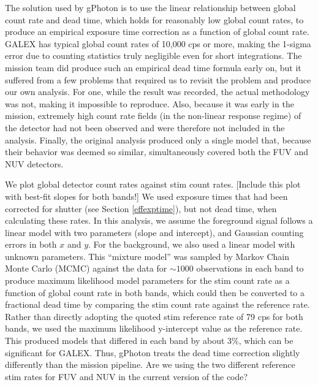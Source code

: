 \documentclass[5p]{elsarticle}
\begin{document}
The solution used by gPhoton is to use the linear relationship between global count rate and dead time, which holds for reasonably low global count rates, to produce an empirical exposure time correction as a function of global count rate. GALEX has typical global count rates of 10,000 cps or more, making the 1-sigma error due to counting statistics truly negligible even for short integrations. The mission team did produce such an empirical dead time formula early on, but it suffered from a few problems that required us to revisit the problem and produce our own analysis. For one, while the result was recorded, the actual methodology was not, making it impossible to reproduce. Also, because it was early in the mission, extremely high count rate fields (in the non-linear response regime) of the detector had not been observed and were therefore not included in the analysis. Finally, the original analysis produced only a single model that, because their behavior was deemed so similar, simultaneously covered both the FUV and NUV detectors.

We plot global detector count rates against stim count rates. {\color{red}[Include this plot with best-fit slopes for both bands!]} We used exposure times that had been corrected for shutter (see Section \ref{effexptime}), but not dead time, when calculating these rates. In this analysis, we assume the foreground signal follows a linear model with two parameters (slope and intercept), and Gaussian counting errors in both $x$ and $y$. For the background, we also used a linear model with unknown parameters. This ``mixture model'' was sampled by Markov Chain Monte Carlo (MCMC) against the data for $\sim 1000$ observations in each band to produce maximum likelihood model parameters for the stim count rate as a function of global count rate in both bands, which could then be converted to a fractional dead time by comparing the stim count rate against the reference rate. Rather than directly adopting the quoted stim reference rate of 79 cps for both bands, we used the maximum likelihood y-intercept value as the reference rate. This produced models that differed in each band by about 3\%, which can be significant for GALEX.  Thus, gPhoton treats the dead time correction slightly differently than the mission pipeline.  {\color{red}Are we using the two different reference stim rates for FUV and NUV in the current version of the code?}
\end{document}
